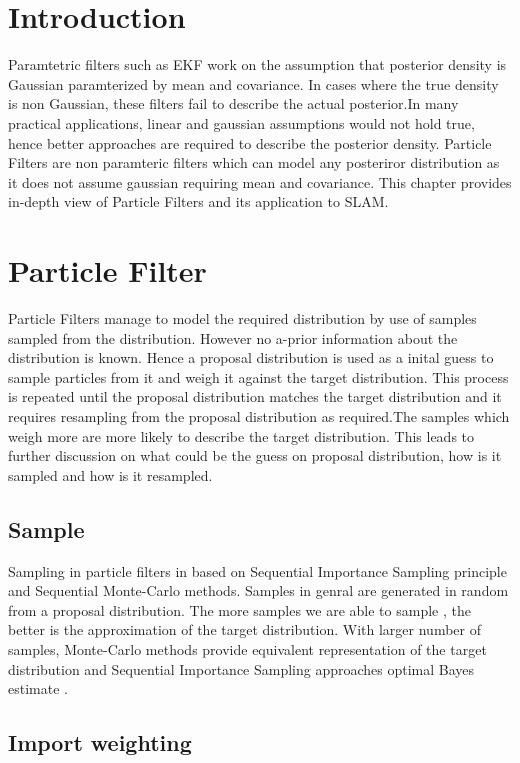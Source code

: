 \section{Introduction}
    Paramtetric filters such as EKF work on the assumption that posterior density is Gaussian paramterized by mean and covariance. In cases where the 
true density is non Gaussian, these filters fail to describe the actual posterior.In many practical applications, linear and gaussian assumptions would
not hold true, hence better approaches are required to describe the posterior density. Particle Filters are non paramteric filters which can model 
any posteriror distribution as it does not assume gaussian requiring mean and covariance. This chapter provides in-depth view of Particle Filters and
its application to SLAM.
\section{Particle Filter}
Particle Filters manage to model the required distribution by use of samples sampled from the distribution. However no a-prior information about the 
distribution is known. Hence a proposal distribution is used as a inital guess to sample particles from it and weigh it against the target distribution.
This process is repeated until the proposal distribution matches the target distribution and it requires resampling from the proposal distribution as
required.The samples which weigh more are more likely to describe the target distribution. This leads to further discussion on what could be the guess 
on proposal distribution, how is it sampled and how is it resampled.

\subsection{Sample}
Sampling in particle filters in based on Sequential Importance Sampling principle and Sequential Monte-Carlo methods. Samples in genral are generated in 
random from a proposal distribution. The more samples we are able to sample , the better is the approximation of the target distribution. With larger 
number of samples, Monte-Carlo methods provide equivalent representation of the target distribution and Sequential Importance Sampling approaches optimal
Bayes estimate \cite{S.Arulampalam}.
\par

\subsection{Import weighting}
